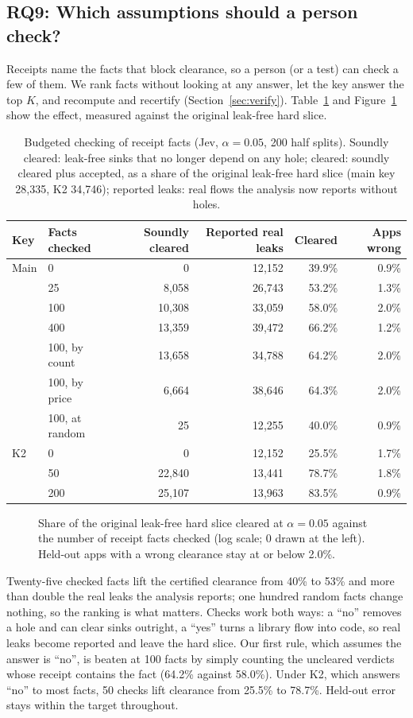 \subsection{RQ9: Which assumptions should a person check?}
\label{sec:rq9}
Receipts name the facts that block clearance, so a person (or a test) can check a few of them.
We rank facts without looking at any answer, let the key answer the top $K$, and recompute and recertify (Section~\ref{sec:verify}).
Table~\ref{tab:verify} and Figure~\ref{fig:verify} show the effect, measured against the original leak-free hard slice.
\begin{table}[t]
\caption{Budgeted checking of receipt facts (Jev, $\alpha=0.05$, 200 half splits). Soundly cleared: leak-free sinks that no longer depend on any hole; cleared: soundly cleared plus accepted, as a share of the original leak-free hard slice (main key 28{,}335, K2 34{,}746); reported leaks: real flows the analysis now reports without holes.}
\label{tab:verify}
\small
\begin{tabular}{@{}llrrrr@{}}
\toprule
Key & Facts checked & Soundly cleared & Reported real leaks & Cleared & Apps wrong\\
\midrule
Main & 0 & 0 & 12{,}152 & 39.9\% & 0.9\%\\
 & 25 & 8{,}058 & 26{,}743 & 53.2\% & 1.3\%\\
 & 100 & 10{,}308 & 33{,}059 & 58.0\% & 2.0\%\\
 & 400 & 13{,}359 & 39{,}472 & 66.2\% & 1.2\%\\
 & 100, by count & 13{,}658 & 34{,}788 & 64.2\% & 2.0\%\\
 & 100, by price & 6{,}664 & 38{,}646 & 64.3\% & 2.0\%\\
 & 100, at random & 25 & 12{,}255 & 40.0\% & 0.9\%\\
\midrule
K2 & 0 & 0 & 12{,}152 & 25.5\% & 1.7\%\\
 & 50 & 22{,}840 & 13{,}441 & 78.7\% & 1.8\%\\
 & 200 & 25{,}107 & 13{,}963 & 83.5\% & 0.9\%\\
\bottomrule
\end{tabular}
\end{table}
\begin{figure}[t]

\caption{Share of the original leak-free hard slice cleared at $\alpha=0.05$ against the number of receipt facts checked (log scale; 0 drawn at the left). Held-out apps with a wrong clearance stay at or below 2.0\%.}
\label{fig:verify}
\end{figure}
Twenty-five checked facts lift the certified clearance from 40\% to 53\% and more than double the real leaks the analysis reports; one hundred random facts change nothing, so the ranking is what matters.
Checks work both ways: a ``no'' removes a hole and can clear sinks outright, a ``yes'' turns a library flow into code, so real leaks become reported and leave the hard slice.
Our first rule, which assumes the answer is ``no'', is beaten at 100 facts by simply counting the uncleared verdicts whose receipt contains the fact (64.2\% against 58.0\%).
Under K2, which answers ``no'' to most facts, 50 checks lift clearance from 25.5\% to 78.7\%.
Held-out error stays within the target throughout.

